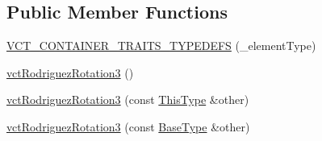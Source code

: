 \subsection*{Public Member Functions}
\begin{DoxyCompactItemize}
\item 
\hyperlink{classvct_rodriguez_rotation3_a86c5c86fe5004b192d12ff055a9e9988}{V\-C\-T\-\_\-\-C\-O\-N\-T\-A\-I\-N\-E\-R\-\_\-\-T\-R\-A\-I\-T\-S\-\_\-\-T\-Y\-P\-E\-D\-E\-F\-S} (\-\_\-element\-Type)
\item 
\hyperlink{classvct_rodriguez_rotation3_ab90c65541c05e3d783e268baf27dd5fe}{vct\-Rodriguez\-Rotation3} ()
\item 
\hyperlink{classvct_rodriguez_rotation3_a58058554210923e3a3925edfa9bf0f7a}{vct\-Rodriguez\-Rotation3} (const \hyperlink{classvct_fixed_size_const_vector_base_a071063bc4fa43112cc287b2dbef53180}{This\-Type} \&other)
\item 
\hyperlink{classvct_rodriguez_rotation3_ad9ca29e5e8e49ffcce8d7af44e812c6d}{vct\-Rodriguez\-Rotation3} (const \hyperlink{classvct_rodriguez_rotation3_a9808e8703a58127607921c08914bda40}{Base\-Type} \&other)
\end{DoxyCompactItemize}
